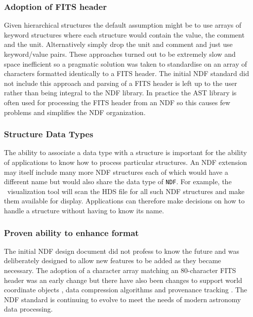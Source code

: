 \documentclass[final,authoryear,5p,times,twocolumn]{elsarticle}
\begin{document}
\subsubsection{Adoption of FITS header}

Given hierarchical structures the default assumption might be to use
arrays of keyword structures where each structure would contain the
value, the comment and the unit. Alternatively simply drop the unit
and comment and just use keyword/value pairs. These approaches turned
out to be extremely slow and space inefficient so a pragmatic solution
was taken to standardise on an array of characters formatted
identically to a FITS header. The initial NDF standard did not include
this approach and parsing of a FITS header is left up to the user
rather than being integral to the NDF library. In practice the AST
library \citep{1998ASPC..145...41W} is often used for processing the FITS
header from an NDF so this causes few problems and simplifies the NDF
organization.

\subsubsection{Structure Data Types}

The ability to associate a data type with a structure is important for
the ability of applications to know how to process particular
structures. An NDF extension may itself include many more NDF
structures each of which would have a different name but would also
share the data type of \texttt{NDF}. For example, the \gaia\
visualization tool \citep{2009ASPC..411..575D} will scan the HDS file
for all such NDF structures and make them available for
display. Applications can therefore make decisions on how to handle a
structure without having to know its name.

\subsubsection{Proven ability to enhance format}

The initial NDF design document did not profess to know the future and
was deliberately designed to allow new features to be added as they
became necessary. The adoption of a character array matching an
80-character FITS header was an early change but there have also been
changes to support world coordinate objects
\citep{2001ASPC..238..129B}, data compression algorithms
\citep{2008ASPC..394..650C} and provenance tracking
\citep{2009ASPC..411..418J}. The NDF standard is continuing to evolve
to meet the needs of modern astronomy data processing.
\end{document}
